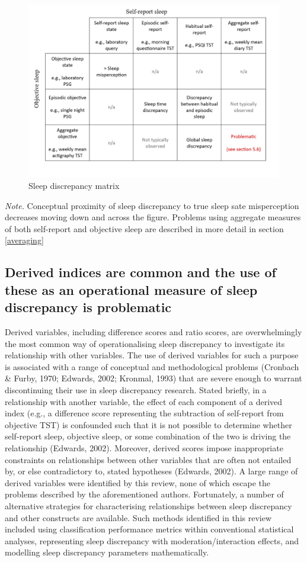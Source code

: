 \documentclass[
]{article}
\begin{document}
\begin{figure}
\centering
\includegraphics{matrix.jpg}
\caption{\label{fig:subtypes}Sleep discrepancy matrix}
\end{figure}

\emph{Note.} Conceptual proximity of sleep discrepancy to true sleep sate misperception decreases moving down and across the figure. Problems using aggregate measures of both self-report and objective sleep are described in more detail in section \ref{averaging}

\subsection{Derived indices are common and the use of these as an operational measure of sleep discrepancy is problematic}\label{dvar}

Derived variables, including difference scores and ratio scores, are overwhelmingly the most common way of operationalising sleep discrepancy to investigate its relationship with other variables. The use of derived variables for such a purpose is associated with a range of conceptual and methodological problems (Cronbach \& Furby, 1970; Edwards, 2002; Kronmal, 1993) that are severe enough to warrant discontinuing their use in sleep discrepancy research. Stated briefly, in a relationship with another variable, the effect of each component of a derived index (e.g., a difference score representing the subtraction of self-report from objective TST) is confounded such that it is not possible to determine whether self-report sleep, objective sleep, or some combination of the two is driving the relationship (Edwards, 2002). Moreover, derived scores impose inappropriate constraints on relationships between other variables that are often not entailed by, or else contradictory to, stated hypotheses (Edwards, 2002). A large range of derived variables were identified by this review, none of which escape the problems described by the aforementioned authors. Fortunately, a number of alternative strategies for characterising relationships between sleep discrepancy and other constructs are available. Such methods identified in this review included using classification performance metrics within conventional statistical analyses, representing sleep discrepancy with moderation/interaction effects, and modelling sleep discrepancy parameters mathematically.
\end{document}
